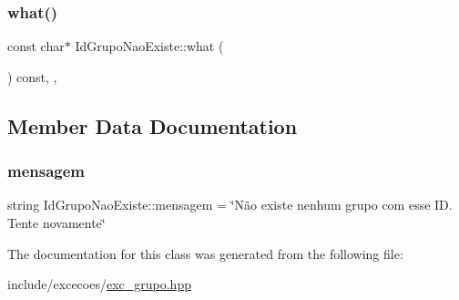 \subsubsection{\texorpdfstring{what()}{what()}}
{\footnotesize\ttfamily const char$\ast$ Id\+Grupo\+Nao\+Existe\+::what (\begin{DoxyParamCaption}{ }\end{DoxyParamCaption}) const\hspace{0.3cm}{\ttfamily [inline]}, {\ttfamily [override]}, {\ttfamily [noexcept]}}



\subsection{Member Data Documentation}
\mbox{\label{classIdGrupoNaoExiste_a75e9a2c40fb07070424acc3666b0babc}} 
\subsubsection{\texorpdfstring{mensagem}{mensagem}}
{\footnotesize\ttfamily string Id\+Grupo\+Nao\+Existe\+::mensagem = \char`\"{}Não existe nenhum grupo com esse I\+D. Tente novamente\char`\"{}\hspace{0.3cm}{\ttfamily [private]}}



The documentation for this class was generated from the following file\+:\begin{DoxyCompactItemize}
\item 
include/excecoes/\hyperlink{exc__grupo_8hpp}{exc\+\_\+grupo.\+hpp}\end{DoxyCompactItemize}
